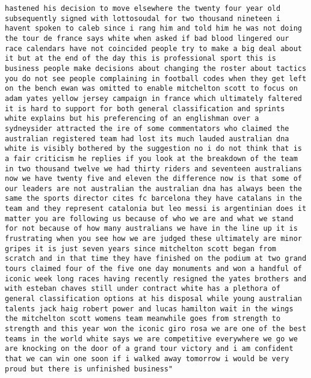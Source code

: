 \documentclass[]{article}
\begin{document}
\begin{verbatim}
hastened his decision to move elsewhere the twenty four year old subsequently signed with lottosoudal for two thousand nineteen i havent spoken to caleb since i rang him and told him he was not doing the tour de france says white when asked if bad blood lingered our race calendars have not coincided people try to make a big deal about it but at the end of the day this is professional sport this is business people make decisions about changing the roster about tactics you do not see people complaining in football codes when they get left on the bench ewan was omitted to enable mitchelton scott to focus on adam yates yellow jersey campaign in france which ultimately faltered it is hard to support for both general classification and sprints white explains but his preferencing of an englishman over a sydneysider attracted the ire of some commentators who claimed the australian registered team had lost its much lauded australian dna white is visibly bothered by the suggestion no i do not think that is a fair criticism he replies if you look at the breakdown of the team in two thousand twelve we had thirty riders and seventeen australians now we have twenty five and eleven the difference now is that some of our leaders are not australian the australian dna has always been the same the sports director cites fc barcelona they have catalans in the team and they represent catalonia but leo messi is argentinian does it matter you are following us because of who we are and what we stand for not because of how many australians we have in the line up it is frustrating when you see how we are judged these ultimately are minor gripes it is just seven years since mitchelton scott began from scratch and in that time they have finished on the podium at two grand tours claimed four of the five one day monuments and won a handful of iconic week long races having recently resigned the yates brothers and with esteban chaves still under contract white has a plethora of general classification options at his disposal while young australian talents jack haig robert power and lucas hamilton wait in the wings the mitchelton scott womens team meanwhile goes from strength to strength and this year won the iconic giro rosa we are one of the best teams in the world white says we are competitive everywhere we go we are knocking on the door of a grand tour victory and i am confident that we can win one soon if i walked away tomorrow i would be very proud but there is unfinished business"
\end{verbatim}
\end{document}
